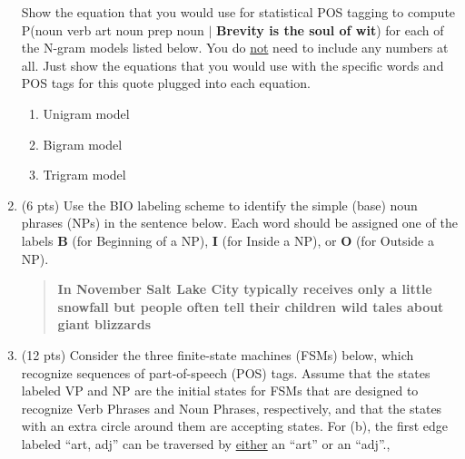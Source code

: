 \documentclass[11pt]{article}
\begin{document}
\begin{enumerate}
Show the equation that you would use for statistical POS tagging to compute P({\sc noun verb art
  noun prep noun} $\mid$ {\bf Brevity is the soul of wit}) for each of the
N-gram models listed below. You do \underline{not} need to include any
numbers at all. Just show the equations that you would use with the
specific words and POS tags for this quote plugged into each
equation. \\

\begin{enumerate}

\item Unigram model \\

\item Bigram model \\

\item Trigram model \\

\end{enumerate}




\newpage

\item (6 pts) Use the BIO labeling scheme to identify the simple
  (base) noun phrases (NPs) in the sentence below. Each word should be
  assigned one of the labels {\bf B} (for Beginning of a NP), {\bf I}
  (for Inside a NP), or {\bf O} (for Outside a NP).  \\

\begin{quote}
{\bf In November Salt Lake City typically receives only a little snowfall but people
 often tell their children wild tales about giant blizzards}
\end{quote}




\newpage

\item (12 pts) Consider the three finite-state machines (FSMs) below, which
  recognize sequences of part-of-speech (POS) tags. Assume that the
  states labeled VP and NP are the initial states for FSMs that are
  designed to recognize Verb Phrases and Noun Phrases, respectively,
  and that the states with an extra circle around them are accepting
  states. For (b), the first edge labeled ``art, adj'' can be
  traversed by \underline{either} an ``art'' or an ``adj''., 


\end{enumerate}
\end{document}
